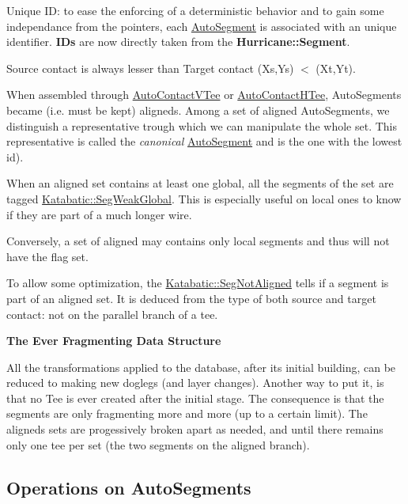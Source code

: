 \begin{DoxyItemize}
\item Unique ID\+: to ease the enforcing of a deterministic behavior and to gain some independance from the pointers, each \hyperlink{classKatabatic_1_1AutoSegment}{Auto\+Segment} is associated with an unique identifier. {\bfseries I\+Ds} are now directly taken from the \textbf{ Hurricane\+::\+Segment}. 
\item Source contact is always lesser than Target contact {\ttfamily (Xs,Ys) $<$ (Xt,Yt)}. 
\item When assembled through \hyperlink{classKatabatic_1_1AutoContactVTee}{Auto\+Contact\+V\+Tee} or \hyperlink{classKatabatic_1_1AutoContactHTee}{Auto\+Contact\+H\+Tee}, Auto\+Segments became (i.\+e. must be kept) aligneds. Among a set of aligned Auto\+Segments, we distinguish a representative trough which we can manipulate the whole set. This representative is called the {\itshape canonical} \hyperlink{classKatabatic_1_1AutoSegment}{Auto\+Segment} and is the one with the lowest {\ttfamily id}). 
\item When an aligned set contains at least one global, all the segments of the set are tagged \hyperlink{namespaceKatabatic_a94585537ee1724ea9315578ec54380f4a16ef6f2b6b9e44559e41f04c652919ad}{Katabatic\+::\+Seg\+Weak\+Global}. This is especially useful on local ones to know if they are part of a much longer wire.

Conversely, a set of aligned may contains only local segments and thus will not have the flag set. 
\item To allow some optimization, the \hyperlink{namespaceKatabatic_a94585537ee1724ea9315578ec54380f4a637e0426170a532feac45548e009325d}{Katabatic\+::\+Seg\+Not\+Aligned} tells if a segment is part of an aligned set. It is deduced from the type of both source and target contact\+: not on the parallel branch of a tee. 
\end{DoxyItemize}

{\bfseries The Ever Fragmenting Data Structure}

All the transformations applied to the database, after it\textquotesingle{}s initial building, can be reduced to making new doglegs (and layer changes). Another way to put it, is that no Tee is ever created after the initial stage. The consequence is that the segments are only fragmenting more and more (up to a certain limit). The aligneds sets are progessively broken apart as needed, and until there remains only one tee per set (the two segments on the aligned branch).\hypertarget{classKatabatic_1_1AutoSegment_secASOperations}{}\subsection{Operations on Auto\+Segments}\label{classKatabatic_1_1AutoSegment_secASOperations}

